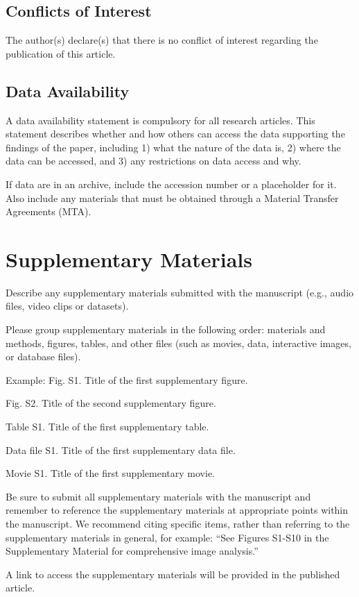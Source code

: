 \documentclass{article}
\begin{document}
\subsection*{Conflicts of Interest}
The author(s) declare(s) that there is no conflict of interest regarding the publication of this article.

\subsection*{Data Availability}
A data availability statement is compulsory for all research articles. This statement describes whether and how others can access the data supporting the findings of the paper, including 1) what the nature of the data is, 2) where the data can be accessed, and 3) any restrictions on data access and why.

If data are in an archive, include the accession number or a placeholder for it. Also include any materials that must be obtained through a Material Transfer Agreements (MTA). 

\section*{Supplementary Materials}
Describe any supplementary materials submitted with the manuscript (e.g., audio files, video clips or datasets). 

Please group supplementary materials in the following order: materials and methods, figures, tables, and other files (such as movies, data, interactive images, or database files). 

\medskip Example:
Fig. S1. Title of the first supplementary figure.

Fig. S2. Title of the second supplementary figure.

Table S1. Title of the first supplementary table.

Data file S1. Title of the first supplementary data file.

Movie S1. Title of the first supplementary movie.

\medskip
Be sure to submit all supplementary materials with the manuscript and remember to reference the supplementary materials at appropriate points within the manuscript. We recommend citing specific items, rather than referring to the supplementary materials in general, for example: ``See Figures S1-S10 in the Supplementary Material for comprehensive image analysis.''

A link to access the supplementary materials will be provided in the published article.
\end{document}
